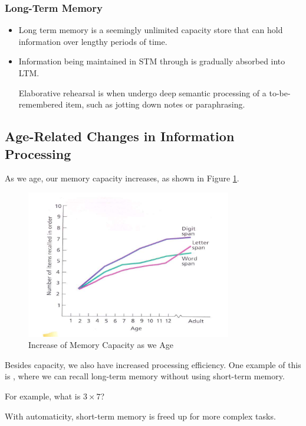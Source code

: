 \documentclass[../main/main.tex]{subfiles}
\begin{document}
  \subsubsection{Long-Term Memory}
\begin{itemize}
\item Long term memory is a seemingly unlimited capacity store that can hold information over lengthy periods of time.
    \item Information being maintained in STM through  is gradually absorbed into LTM.
    \begin{definition}
Elaborative rehearsal is when undergo deep semantic processing of a to-be-remembered item, such as jotting down notes or paraphrasing.
                                                \end{definition}

    \end{itemize}

\subsection{Age-Related Changes in Information Processing}
    As we age, our memory capacity increases, as shown in Figure \ref{fig:3-5-cap}.\\
\begin{figure}[h!]
	    \centering
	    \includegraphics[width=0.8\textwidth]{../images/3-5-cap}
	                \caption{Increase of Memory Capacity as we Age}
	    \label{fig:3-5-cap}
    \end{figure}

    Besides capacity, we also have increased processing efficiency. One example of this is , where we can recall long-term memory without using short-term memory.
    \begin{example}
For example, what is $3\times 7$?
                                    \end{example}
    With automaticity, short-term memory is freed up for more complex tasks. \\
\end{document}
